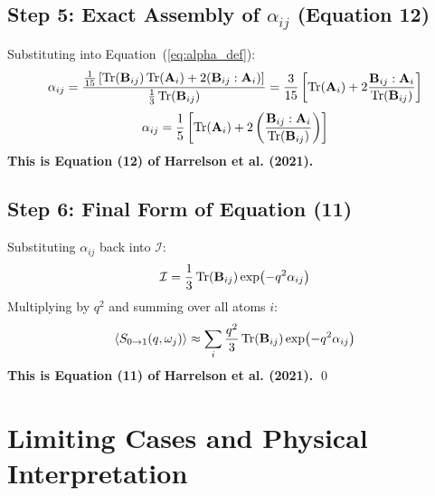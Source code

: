 \documentclass[11pt,a4paper]{article}
\begin{document}
\subsection{Step 5: Exact Assembly of $\alpha_{ij}$ (Equation 12)}
Substituting into Equation~(\ref{eq:alpha_def}):
\begin{equation}
\alpha_{ij} = \frac{\frac{1}{15} \left[ \Tr(\mathbf{B}_{ij}) \Tr(\mathbf{A}_i) + 2 (\mathbf{B}_{ij} : \mathbf{A}_i) \right]}{\frac{1}{3} \Tr(\mathbf{B}_{ij})} = \frac{3}{15} \left[ \Tr(\mathbf{A}_i) + 2 \frac{\mathbf{B}_{ij} : \mathbf{A}_i}{\Tr(\mathbf{B}_{ij})} \right]
\end{equation}
\begin{equation}
\alpha_{ij} = \frac{1}{5} \left[ \Tr(\mathbf{A}_i) + 2 \left( \frac{\mathbf{B}_{ij} : \mathbf{A}_i}{\Tr(\mathbf{B}_{ij})} \right) \right]
\label{eq:harrelson12}
\end{equation}
\textbf{This is Equation (12) of Harrelson et al. (2021).}

\subsection{Step 6: Final Form of Equation (11)}
Substituting $\alpha_{ij}$ back into $\mathcal{I}$:
\begin{equation}
\mathcal{I} = \frac{1}{3} \Tr(\mathbf{B}_{ij}) \exp(-q^2 \alpha_{ij})
\end{equation}
Multiplying by $q^2$ and summing over all atoms $i$:
\begin{equation}
\ev{S_{0 \to 1}(q, \omega_j)} \approx \sum_i \frac{q^2}{3} \Tr(\mathbf{B}_{ij}) \exp(-q^2 \alpha_{ij})
\label{eq:harrelson11}
\end{equation}
\textbf{This is Equation (11) of Harrelson et al. (2021).} \qed

\section{Limiting Cases and Physical Interpretation}
\end{document}
